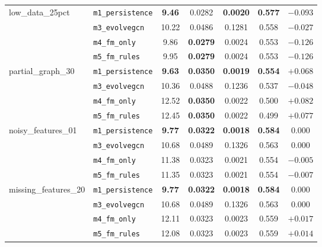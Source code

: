 \begin{table}[!htbp]
\begin{tabular}{l l c c c c c}
\midrule
\multirow{4}{*}{low\_data\_25pct}
& \texttt{m1\_persistence} & \textbf{9.46}  & 0.0282          & \textbf{0.0020} & \textbf{0.577} & $-0.093$ \\
& \texttt{m3\_evolvegcn}   & 10.22          & 0.0486          & 0.1281          & 0.558          & $\mathbf{-0.027}$ \\
& \texttt{m4\_fm\_only}    & 9.86           & \textbf{0.0279} & 0.0024          & 0.553          & $-0.126$ \\
& \texttt{m5\_fm\_rules}   & 9.95           & \textbf{0.0279} & 0.0024          & 0.553          & $-0.126$ \\
\midrule
\multirow{4}{*}{partial\_graph\_30}
& \texttt{m1\_persistence} & \textbf{9.63}  & \textbf{0.0350} & \textbf{0.0019} & \textbf{0.554} & $+0.068$ \\
& \texttt{m3\_evolvegcn}   & 10.36          & 0.0488          & 0.1236          & 0.537          & $\mathbf{-0.048}$ \\
& \texttt{m4\_fm\_only}    & 12.52          & \textbf{0.0350} & 0.0022          & 0.500          & $+0.082$ \\
& \texttt{m5\_fm\_rules}   & 12.45          & \textbf{0.0350} & 0.0022          & 0.499          & $+0.077$ \\
\midrule
\multirow{4}{*}{noisy\_features\_01}
& \texttt{m1\_persistence} & \textbf{9.77}  & \textbf{0.0322} & \textbf{0.0018} & \textbf{0.584} & $0.000$ \\
& \texttt{m3\_evolvegcn}   & 10.68          & 0.0489          & 0.1326          & 0.563          & $0.000$ \\
& \texttt{m4\_fm\_only}    & 11.38          & 0.0323          & 0.0021          & 0.554          & $-0.005$ \\
& \texttt{m5\_fm\_rules}   & 11.35          & 0.0323          & 0.0021          & 0.554          & $-0.007$ \\
\midrule
\multirow{4}{*}{missing\_features\_20}
& \texttt{m1\_persistence} & \textbf{9.77}  & \textbf{0.0322} & \textbf{0.0018} & \textbf{0.584} & $0.000$ \\
& \texttt{m3\_evolvegcn}   & 10.68          & 0.0489          & 0.1326          & 0.563          & $0.000$ \\
& \texttt{m4\_fm\_only}    & 12.11          & 0.0323          & 0.0023          & 0.559          & $+0.017$ \\
& \texttt{m5\_fm\_rules}   & 12.08          & 0.0323          & 0.0023          & 0.559          & $+0.014$ \\
\bottomrule
\end{tabular}
\end{table}
